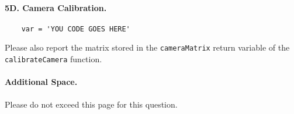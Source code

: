 \paragraph{5D. Camera Calibration.}
%
\begin{verbatim}
    var = 'YOU CODE GOES HERE'
\end{verbatim}

Please also report the matrix stored in the \texttt{cameraMatrix} return variable of the \texttt{calibrateCamera} function.


\newpage
\paragraph{Additional Space.}
Please do not exceed this page for this question.

